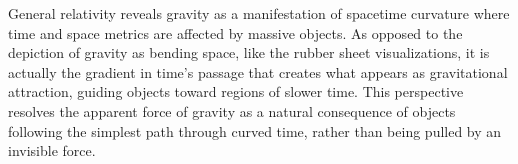 General relativity reveals gravity as a manifestation of spacetime curvature where time and space metrics are affected by massive objects. As opposed to the depiction of gravity as bending space, like the rubber sheet visualizations, it is actually the gradient in time's passage that creates what appears as gravitational attraction, guiding objects toward regions of slower time. This perspective resolves the apparent force of gravity as a natural consequence of objects following the simplest path through curved time, rather than being pulled by an invisible force.
